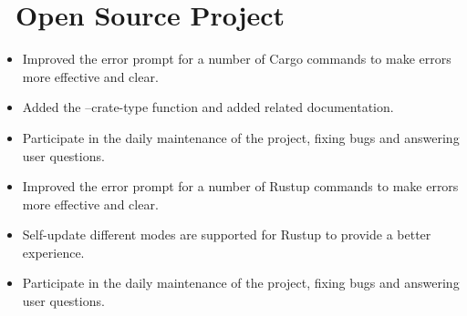 \documentclass{resume}
\newcommand{\en}[1]{#1}
\newcommand{\zh}[1]{}
\begin{document}
\section{\faGithubAlt\ \en{Open Source Project}\zh{开源项目}}
\en{}
\zh{\role{活跃贡献者}{\href{https://github.com/rust-lang/cargo/commits?author=hi-rustin}{136+ 个提交}}}
\begin{itemize}
      \item \en{Improved the error prompt for a number of Cargo commands to make errors more effective and clear.}
            \zh{改善了大量 Cargo 命令的错误提示，让错误更有效更清晰。}
      \item \en{Added the --crate-type function and added related documentation.}
            \zh{添加了 --crate-type 功能并添加相关文档。}
      \item \en{Participate in the daily maintenance of the project, fixing bugs and answering user questions.}
            \zh{参与项目日常维护，修复 bug 和回答用户问题。}
\end{itemize}

\en{}
\zh{\role{维护者}{\href{https://github.com/rust-lang/rustup/commits?author=hi-rustin}{57+ 个提交}}}
\begin{itemize}
      \item \en{Improved the error prompt for a number of Rustup commands to make errors more effective and clear.}
            \zh{改善了大量 Rustup 命令的错误提示，让错误更有效更清晰。}
      \item \en{Self-update different modes are supported for Rustup to provide a better experience.}
            \zh{为 Rustup 支持了 self-update 不同模式来提供更好的使用体验。}
      \item \en{Participate in the daily maintenance of the project, fixing bugs and answering user questions.}
            \zh{参与项目日常维护，修复 bug 和回答用户问题。}
\end{itemize}
\end{document}
